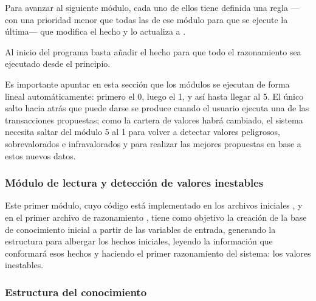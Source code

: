 \documentclass[a4paper, 11pt, titlepage]{article}
\begin{document}
    Para avanzar al siguiente módulo, cada uno de ellos tiene definida una regla ---con una prioridad menor que todas las de ese módulo para que se ejecute la última--- que modifica el hecho  y lo actualiza a .

    Al inicio del programa basta añadir el hecho  para que todo el razonamiento sea ejecutado desde el principio.

    Es importante apuntar en esta sección que los módulos se ejecutan de forma lineal automáticamente: primero el 0, luego el 1, y así hasta llegar al 5. El único salto hacia atrás que puede darse se produce cuando el usuario ejecuta una de las transacciones propuestas; como la cartera de valores habrá cambiado, el sistema necesita saltar del módulo 5 al 1 para volver a detectar valores peligrosos, sobrevalorados e infravalorados y para realizar las mejores propuestas en base a estos nuevos datos.

    \subsubsection{Módulo de lectura y detección de valores inestables}
    \label{ch:modLectura}

    Este primer módulo, cuyo código está implementado en los archivos iniciales ,  y en el primer archivo de razonamiento , tiene como objetivo la creación de la base de conocimiento inicial a partir de las variables de entrada, generando la estructura para albergar los hechos iniciales, leyendo la información que conformará esos hechos y haciendo el primer razonamiento del sistema: los valores inestables.

    \subsubsection*{Estructura del conocimiento}
\end{document}
